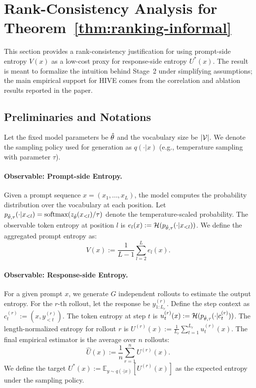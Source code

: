 \section{Rank-Consistency Analysis for Theorem~\ref{thm:ranking-informal}}
\label{appendix-sec:proof-thm}
This section provides a rank-consistency justification for using prompt-side entropy $V(x)$ as a low-cost proxy for response-side entropy $U^*(x)$. The result is meant to formalize the intuition behind Stage~2 under simplifying assumptions; the main empirical support for HIVE comes from the correlation and ablation results reported in the paper.

\subsection{Preliminaries and Notations}
Let the fixed model parameters be $\hat{\theta}$ and the vocabulary size be $|\mathcal{V}|$. We denote the sampling policy used for generation as $q(\cdot|x)$ (e.g., temperature sampling with parameter $\tau$).

\paragraph{Observable: Prompt-side Entropy.} 
Given a prompt sequence $x = (x_1, \dots, x_L)$, the model computes the probability distribution over the vocabulary at each position. Let $p_{\hat{\theta}, \tau}(\cdot|x_{<l}) = \text{softmax}(z_{\hat{\theta}}(x_{<l})/\tau)$ denote the temperature-scaled probability. The observable token entropy at position $l$ is $e_l(x) := \mathcal{H}(p_{\hat{\theta}, \tau}(\cdot|x_{<l}))$. We define the aggregated prompt entropy as:
\begin{equation}
  V(x) := \frac{1}{L-1}\sum_{l=2}^{L} e_l(x).
\end{equation}

\paragraph{Observable: Response-side Entropy.} 
For a given prompt $x$, we generate $G$ independent rollouts to estimate the output entropy. For the $r$-th rollout, let the response be $y^{(r)}_{1:L_r}$. Define the step context as $c_t^{(r)} := (x, y_{<t}^{(r)})$. The token entropy at step $t$ is $u_t^{(r)}(x) := \mathcal{H}(p_{\hat{\theta}, \tau}(\cdot|c_t^{(r)}))$. 
The length-normalized entropy for rollout $r$ is $U^{(r)}(x) := \frac{1}{L_r}\sum_{t=1}^{L_r} u_t^{(r)}(x)$.
The final empirical estimator is the average over $n$ rollouts:
\begin{equation}
  \hat{U}(x) := \frac{1}{n}\sum_{r=1}^{n} U^{(r)}(x).
\end{equation}
We define the target $U^*(x) := \mathbb{E}_{y \sim q(\cdot|x)}[U^{(r)}(x)]$ as the expected entropy under the sampling policy.

